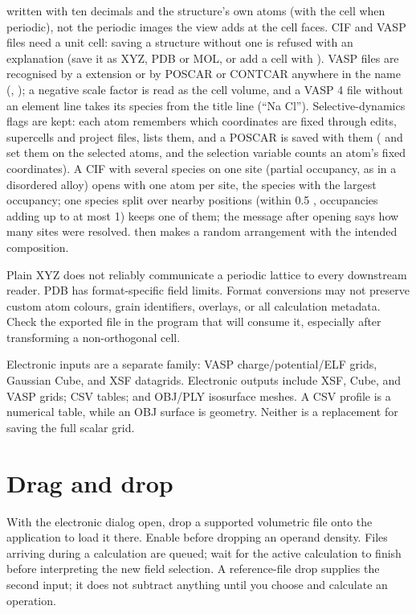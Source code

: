 written with ten decimals and the structure's own atoms (with the cell when periodic), not the periodic images the view adds at the cell faces. CIF and VASP files need a unit cell: saving a structure without one is refused with an explanation (save it as XYZ, PDB or MOL, or add a cell with ). VASP files are recognised by a  extension or by POSCAR or CONTCAR anywhere in the name (, ); a negative scale factor is read as the cell volume, and a VASP 4 file without an element line takes its species from the title line (``Na Cl''). Selective-dynamics flags are kept: each atom remembers which coordinates are fixed through edits, supercells and project files,  lists them, and a POSCAR is saved with them ( and  set them on the selected atoms, and the selection variable  counts an atom's fixed coordinates). A CIF with several species on one site (partial occupancy, as in a disordered alloy) opens with one atom per site, the species with the largest occupancy; one species split over nearby positions (within 0.5 \angstrom{}, occupancies adding up to at most 1) keeps one of them; the message after opening says how many sites were resolved.  then makes a random arrangement with the intended composition.

Plain XYZ does not reliably communicate a periodic lattice to every downstream reader. PDB has format-specific field limits. Format conversions may not preserve custom atom colours, grain identifiers, overlays, or all calculation metadata. Check the exported file in the program that will consume it, especially after transforming a non-orthogonal cell.

Electronic inputs are a separate family: VASP charge/potential/ELF grids, Gaussian Cube, and XSF datagrids. Electronic outputs include XSF, Cube, and VASP grids; CSV tables; and OBJ/PLY isosurface meshes. A CSV profile is a numerical table, while an OBJ surface is geometry. Neither is a replacement for saving the full scalar grid.

\section{Drag and drop}
With the electronic dialog open, drop a supported volumetric file onto the application to load it there. Enable  before dropping an operand density. Files arriving during a calculation are queued; wait for the active calculation to finish before interpreting the new field selection. A reference-file drop supplies the second input; it does not subtract anything until you choose and calculate an operation.

